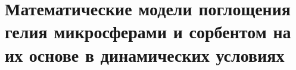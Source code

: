 \section{Математические модели поглощения гелия микросферами и сорбентом на их основе в динамических условиях}
